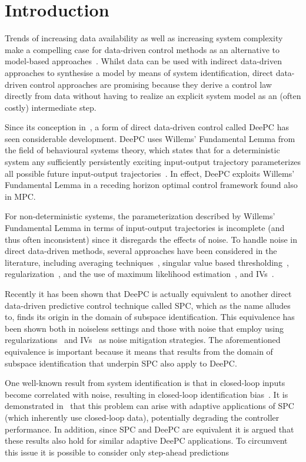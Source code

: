 \section{Introduction}
Trends of increasing data availability as well as increasing system complexity make a compelling case for data-driven control methods as an alternative to model-based approaches~\cite{Hou2013}. Whilst data can be used with indirect data-driven approaches to synthesise a model by means of system identification, direct data-driven control approaches are promising because they derive a control law directly from data without having to realize an explicit system model as an (often costly) intermediate step.

Since its conception in~\cite{Coulson2019}, a form of direct data-driven control called \ac{DeePC} has seen considerable development. \ac{DeePC} uses Willems' Fundamental Lemma from the field of behavioural systems theory, which states that for a deterministic system any sufficiently persistently exciting input-output trajectory parameterizes all possible future input-output trajectories~\cite{Willems2005}. In effect, \ac{DeePC} exploits Willems' Fundamental Lemma in a receding horizon optimal control framework found also in \ac{MPC}.

For non-deterministic systems, the parameterization described by Willems' Fundamental Lemma in terms of input-output trajectories is incomplete (and thus often inconsistent) since it disregards the effects of noise. To handle noise in direct data-driven methods, several approaches have been considered in the literature, including averaging techniques~\cite{Jo2022}, singular value based thresholding~\cite{Sassella2022}, regularization~\cite{Coulson2019}, and the use of maximum likelihood estimation~\cite{Yin2023}, and \ac{IVs}~\cite{vanWingerden2022}.

Recently it has been shown that \ac{DeePC} is actually equivalent to another direct data-driven predictive control technique called \ac{SPC}, which as the name alludes to, finds its origin in the domain of subspace identification. This equivalence has been shown both in noiseless settings and those with noise that employ using regularizations~\cite{Fiedler2021} and \ac{IVs}~\cite{vanWingerden2022} as noise mitigation strategies. The aforementioned equivalence is important because it means that results from the domain of subspace identification that underpin \ac{SPC} also apply to \ac{DeePC}.

One well-known result from system identification is that in closed-loop inputs become correlated with noise, resulting in closed-loop identification bias~\cite{Soderstrom1989}. It is demonstrated in~\cite{Dinkla2023} that this problem can arise with adaptive applications of \ac{SPC} (which inherently use closed-loop data), potentially degrading the controller performance. In addition, since \ac{SPC} and \ac{DeePC} are equivalent it is argued that these results also hold for similar adaptive \ac{DeePC} applications. To circumvent this issue it is possible to consider only step-ahead predictions~\cite{Ljung1996}


